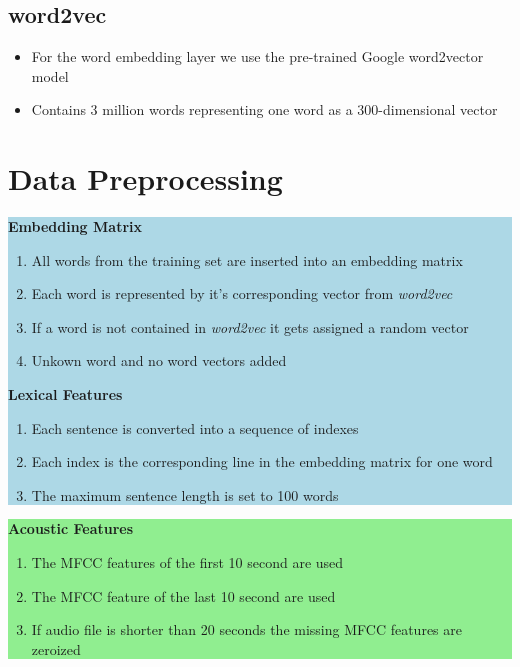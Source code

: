 \documentclass[a0,landscape]{a0poster}
\begin{document}
\begin{multicols}{3}
\subsection*{word2vec}
\begin{itemize}
	\item For the word embedding layer we use the pre-trained Google word2vector model
	\item Contains 3 million words representing one word as a 300-dimensional vector
\end{itemize}

\large
\section*{Data Preprocessing}
\colorbox{lightblue}{
	\parbox{1025pt}{
		\vspace{0.5cm}
		{\LARGE \textbf{Embedding Matrix}}
		\begin{enumerate}
			\item All words from the training set are inserted into an embedding matrix
			\item Each word is represented by it's corresponding vector from \textit{word2vec}
			\item If a word is not contained in \textit{word2vec} it gets assigned a random vector
			\item Unkown word and no word vectors added
		\end{enumerate}
		\vspace{0.5cm}
		{\LARGE \textbf{Lexical Features}}
		\begin{enumerate}	
			\item Each sentence is converted into a sequence of indexes
			\item Each index is the corresponding line in the embedding matrix for one word
			\item The maximum sentence length is set to 100 words
		\end{enumerate}
}}
\colorbox{lightgreen}{
	\parbox{1025pt}{
		\vspace{0.5cm}
		{\LARGE \textbf{Acoustic Features}}
		\begin{enumerate}
			\item The MFCC features of the first 10 second are used
			\item The MFCC feature of the last 10 second are used 
			\item If audio file is shorter than 20 seconds the missing MFCC features are zeroized
		\end{enumerate}
	}}


\end{multicols}
\end{document}
